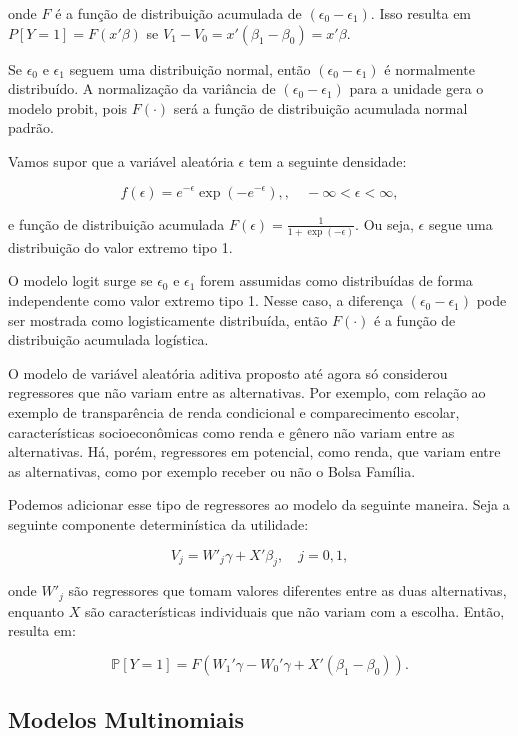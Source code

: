 \documentclass[12pt]{article}
\theoremstyle{break}
\newcommand{\Pb}{\mathbb{P}} %
\begin{document}
onde \( F \) é a função de distribuição acumulada de \( (\epsilon_0 - \epsilon_1) \). Isso resulta em \( P[Y = 1] = F({x}'{\beta}) \) se \( V_1 - V_0 = {x}'({\beta}_1 - {\beta}_0) = {x}'{\beta} \).

Se \( \epsilon_0 \) e \( \epsilon_1 \) seguem uma distribuição normal, então \( (\epsilon_0 - \epsilon_1) \) é normalmente distribuído. A normalização da variância de \( (\epsilon_0 - \epsilon_1) \) para a unidade gera o modelo probit, pois \( F(\cdot) \) será a função de distribuição acumulada normal padrão.

Vamos supor que a variável aleatória \( \epsilon \) tem a seguinte densidade:

\[
f(\epsilon) = e^{-\epsilon} \exp(-e^{-\epsilon}),
, \quad -\infty < \epsilon < \infty, 
\]

e função de distribuição acumulada \( F(\epsilon) = \frac{1}{1 + \exp(-\epsilon)} \). Ou seja, \( \epsilon \) segue uma distribuição do valor extremo tipo 1.

O modelo logit surge se \( \epsilon_0 \) e \(\epsilon_1 \) forem assumidas como distribuídas de forma independente como valor extremo tipo 1. Nesse caso, a diferença \( (\epsilon_0 - \epsilon_1) \) pode ser mostrada como logisticamente distribuída, então \( F(\cdot) \) é a função de distribuição acumulada logística.

O modelo de variável aleatória aditiva proposto até agora só considerou regressores que não variam entre as alternativas. Por exemplo, com relação ao exemplo de transparência de renda condicional e comparecimento escolar, características socioeconômicas como renda e gênero não variam entre as alternativas. Há, porém, regressores em potencial, como renda, que variam entre as alternativas, como por exemplo receber ou não o Bolsa Família.

Podemos adicionar esse tipo de regressores ao modelo da seguinte maneira. Seja a seguinte componente determinística da utilidade:

\[
V_{j} =  {W}'_j{\gamma} + {X}' {\beta}_j, \quad j = 0, 1,
\]

onde \( {W}'_j \) são regressores que tomam valores diferentes entre as duas alternativas, enquanto 
\( {X} \) são características individuais que não variam com a escolha. Então, resulta em:

\[
\Pb[Y = 1] = F\left({W}_{1}'{\gamma} - {W}_{0}'{\gamma} + {X}'({\beta}_1 - {\beta}_0)\right).
\]

\subsection{Modelos Multinomiais}
\end{document}
